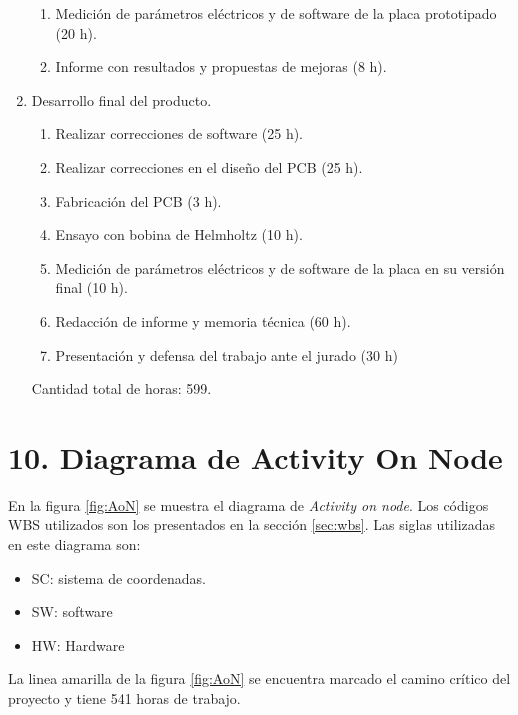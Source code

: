 \documentclass[
11pt, %
]{charter}
\begin{document}
\begin{enumerate}
\begin{enumerate}
			\item  Medición de parámetros eléctricos y de software de la placa prototipado (20 h).
			\item  Informe con resultados y propuestas de mejoras (8 h).	
		\end{enumerate}
	\item Desarrollo final del producto. 
		\begin{enumerate}
			\item Realizar correcciones de software (25 h). 
			\item Realizar correcciones en el diseño del PCB (25 h).
			\item Fabricación del PCB (3 h). 
			\item Ensayo con bobina de Helmholtz (10 h). 		
			\item Medición de parámetros eléctricos y de software de la placa en su versión final (10 h). 
			\item Redacción de informe y memoria técnica (60 h).
			\item Presentación y defensa del trabajo ante el jurado (30 h) 
		\end{enumerate}

Cantidad total de horas: 599.  


\end{enumerate}





\section{10. Diagrama de Activity On Node}
\label{sec:AoN}
	En la figura \ref{fig:AoN} se muestra el diagrama de \textit{Activity on node}. Los códigos WBS utilizados son los presentados en la sección \ref{sec:wbs}. Las siglas utilizadas en este diagrama son: 
	\begin{itemize}
		\item SC: sistema de coordenadas. 
		\item SW: software
		\item HW: Hardware
	\end{itemize}

La linea amarilla de la figura \ref{fig:AoN} se encuentra marcado el camino crítico del proyecto y tiene 541 horas de trabajo. 
\end{document}
